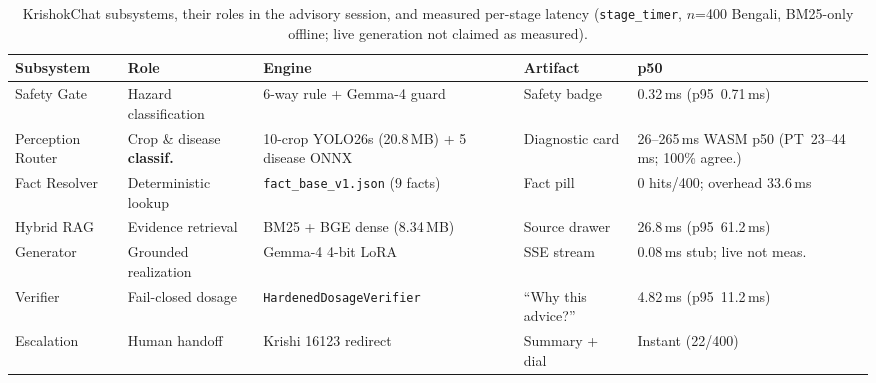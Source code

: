 \begin{table}[t]
\centering
\caption{KrishokChat subsystems, their roles in the advisory session, and measured per-stage latency (\texttt{stage\_timer}, $n$=400 Bengali, BM25-only offline; live generation not claimed as measured).}
\label{tab:system_capabilities}
\scriptsize
\setlength{\tabcolsep}{2.5pt}
\renewcommand{\arraystretch}{1.08}
\begin{adjustbox}{max width=\textwidth}
\begin{tabular}{p{2.3cm}p{2.5cm}p{3.4cm}p{2.5cm}p{3.0cm}}
\toprule
\textbf{Subsystem} & \textbf{Role} & \textbf{Engine} & \textbf{Artifact} & \textbf{p50} \\
\midrule
Safety Gate & Hazard classification & 6-way rule + Gemma-4 guard & Safety badge & 0.32\,ms (p95~0.71\,ms) \\
Perception Router & Crop \& disease \textbf{classif.} & 10-crop YOLO26s (20.8\,MB) + 5 disease ONNX & Diagnostic card & 26--265\,ms WASM p50 (PT~23--44\,ms; 100\% agree.) \\
Fact Resolver & Deterministic lookup & \texttt{fact\_base\_v1.json} (9 facts) & Fact pill & 0 hits/400; overhead 33.6\,ms \\
Hybrid RAG & Evidence retrieval & BM25 + BGE dense (8.34\,MB) & Source drawer & 26.8\,ms (p95~61.2\,ms) \\
Generator & Grounded realization & Gemma-4 4-bit LoRA & SSE stream & 0.08\,ms stub; live not meas. \\
Verifier & Fail-closed dosage & \texttt{HardenedDosageVerifier} & ``Why this advice?'' & 4.82\,ms (p95~11.2\,ms) \\
Escalation & Human handoff & Krishi 16123 redirect & Summary + dial & Instant (22/400) \\
\bottomrule
\end{tabular}
\end{adjustbox}
\end{table}